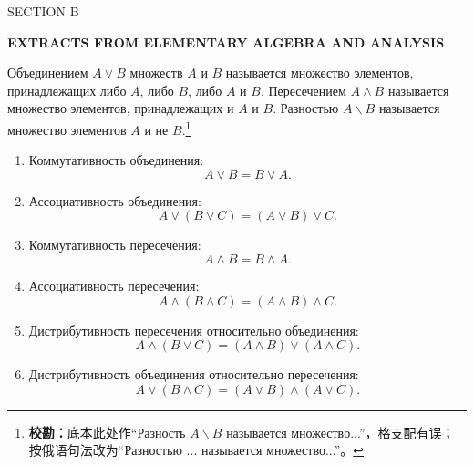 \newcommand{\bcorrnote}[1]{\footnote{{\fontspec{Noto Serif}\textbf{校勘：}#1}}}

\clearpage
\begin{center}
{\sffamily\color{BellaBlue}\Large SECTION B\par}
\vspace{0.8ex}
{\bfseries\Large EXTRACTS FROM ELEMENTARY ALGEBRA AND ANALYSIS\par}
\end{center}
\begingroup
\sloppy
\setlength{\emergencystretch}{4em}

\begin{rusblock}
Объединением $A\vee B$ множеств $A$ и $B$ называется множество элементов, принадлежащих либо $A$, либо $B$, либо $A$ и $B$. Пересечением $A\wedge B$ называется множество элементов, принадлежащих и $A$ и $B$. Разностью $A\backslash B$ называется множество элементов $A$ и не $B$.\bcorrnote{底本此处作“Разность $A\backslash B$ называется множество...”，格支配有误；按俄语句法改为“Разностью ... называется множество...”。}
\end{rusblock}

\begin{rusblock}
\begin{enumerate}[leftmargin=2.2em]
\item Коммутативность объединения:
\[A\vee B=B\vee A.\]
\item Ассоциативность объединения:
\[A\vee(B\vee C)=(A\vee B)\vee C.\]
\item Коммутативность пересечения:
\[A\wedge B=B\wedge A.\]
\item Ассоциативность пересечения:
\[A\wedge(B\wedge C)=(A\wedge B)\wedge C.\]
\item Дистрибутивность пересечения относительно объединения:
\[A\wedge(B\vee C)=(A\wedge B)\vee(A\wedge C).\]
\item Дистрибутивность объединения относительно пересечения:
\[A\vee(B\wedge C)=(A\vee B)\wedge(A\vee C).\]
\end{enumerate}
\end{rusblock}

